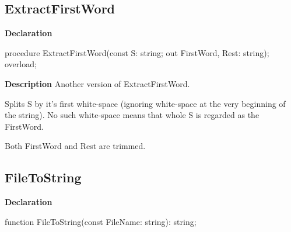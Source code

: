 \documentclass{report}
\newif\ifpdf
\begin{document}
\subsection*{ExtractFirstWord}
\fi
\label{PasDoc_Utils-ExtractFirstWord}
\begin{list}{}{
\setlength{\itemindent}{0cm}
\setlength{\listparindent}{0cm}
\setlength{\leftmargin}{\evensidemargin}
\addtolength{\leftmargin}{\tmplength}
\settowidth{\labelsep}{X}
\addtolength{\leftmargin}{\labelsep}
\setlength{\labelwidth}{\tmplength}
}
\item[\textbf{Declaration}\hfill]
\ifpdf
\begin{flushleft}
\fi
\begin{ttfamily}
procedure ExtractFirstWord(const S: string; out FirstWord, Rest: string); overload;\end{ttfamily}

\ifpdf
\end{flushleft}
\fi

\par
\item[\textbf{Description}]
Another version of ExtractFirstWord.

Splits S by it's first white{-}space (ignoring white{-}space at the very beginning of the string). No such white{-}space means that whole S is regarded as the FirstWord.

Both FirstWord and Rest are trimmed.

\end{list}
\ifpdf
\subsection*{\large{\textbf{FileToString}}\normalsize\hspace{1ex}\hrulefill}
\else
\subsection*{FileToString}
\fi
\label{PasDoc_Utils-FileToString}
\begin{list}{}{
\setlength{\itemindent}{0cm}
\setlength{\listparindent}{0cm}
\setlength{\leftmargin}{\evensidemargin}
\addtolength{\leftmargin}{\tmplength}
\settowidth{\labelsep}{X}
\addtolength{\leftmargin}{\labelsep}
\setlength{\labelwidth}{\tmplength}
}
\item[\textbf{Declaration}\hfill]
\ifpdf
\begin{flushleft}
\fi
\begin{ttfamily}
function FileToString(const FileName: string): string;\end{ttfamily}

\ifpdf
\end{flushleft}
\fi

\end{list}
\ifpdf
\end{document}
